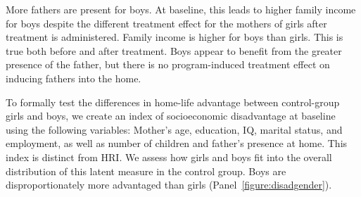 More fathers are present for boys. At baseline, this leads to higher family income for boys despite the different treatment effect for the mothers of girls after treatment is administered. Family income is higher for boys than girls. This is true both before and after treatment. Boys appear to benefit from the greater presence of the father, but there is no program-induced treatment effect on inducing fathers into the home.

To formally test the differences in home-life advantage between control-group girls and boys, we create an index of socioeconomic disadvantage at baseline using the following variables: Mother's age, education, IQ, marital status, and employment, as well as number of children and father's presence at home. This index is distinct from HRI. We assess how girls and boys fit into the overall distribution of this latent measure in the control group. Boys are disproportionately more advantaged than girls (Panel~\ref{figure:disadgender}).

